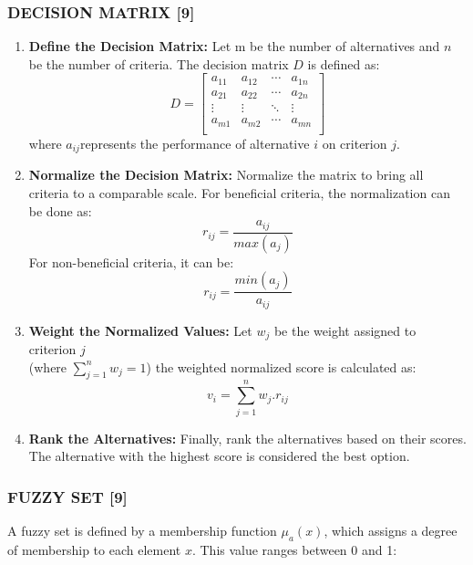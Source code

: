 \documentclass[12pt,a4paper]{article}
\begin{document}
\subsubsection*{DECISION MATRIX [9]}
\begin{enumerate}
\item\textbf{Define the Decision Matrix:} Let m be the number of alternatives and $n$ be the number of criteria. The decision matrix $D$ is defined as:
\[
D=
\begin{bmatrix}
a_{11} & a_{12} &\cdots & a_{1n}\\
a_{21} & a_{22} &\cdots & a_{2n}\\
\vdots & \vdots & \ddots & \vdots\\
a_{m1} & a_{m2} &\cdots & a_{mn}\\
\end{bmatrix}
\]
where $a_{ij}$represents the performance of alternative $i$ on criterion $j$.\\
\item\textbf{Normalize the Decision Matrix:} Normalize the matrix to bring all criteria to a comparable scale. For beneficial criteria, the normalization can be done as:
\begin{equation*}
      r_{ij}=\frac{a_{ij}}{max(a_{j})}      
\end{equation*}
For non-beneficial criteria, it can be:
\begin{equation*}
      r_{ij}=\frac{min(a_{j})}{a_{ij}}  
\end{equation*}

\item\textbf{Weight the Normalized Values:} Let $w_{j}$ be the weight assigned to criterion $j$ \\(where $\sum\limits^{n}_{j=1}w_{j}=1 $) the weighted normalized score is calculated as:
\begin{equation*}
    v_{i}=\sum\limits^{n}_{j=1}w_{j}.r_{ij}
\end{equation*}

\item\textbf{Rank the Alternatives:} Finally, rank the alternatives based on their scores. The alternative with the highest score is considered the best option.
\end{enumerate}



\subsubsection*{FUZZY SET [9] }
\hspace{1em}A fuzzy set is defined by a membership function $\mu_{a}(x)$, which assigns a degree of membership to each element $x$. This value ranges between 0 and 1:
\end{document}
